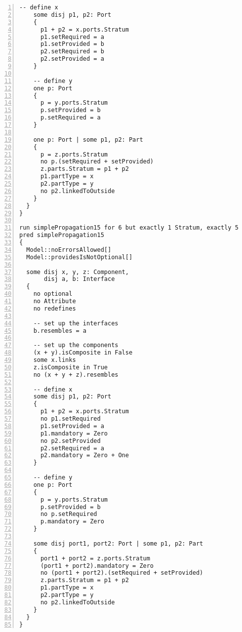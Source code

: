\begin{lstlisting}[caption={unittests\_inference.als}, numbers=left]
    -- define x
    some disj p1, p2: Port
    {
      p1 + p2 = x.ports.Stratum
      p1.setRequired = a
      p1.setProvided = b
      p2.setRequired = b
      p2.setProvided = a
    }
    
    -- define y
    one p: Port
    {
      p = y.ports.Stratum
      p.setProvided = b
      p.setRequired = a
    }
    
    one p: Port | some p1, p2: Part
    {
      p = z.ports.Stratum
      no p.(setRequired + setProvided)
      z.parts.Stratum = p1 + p2
      p1.partType = x
      p2.partType = y
      no p2.linkedToOutside
    }
  }
}

run simplePropagation15 for 6 but exactly 1 Stratum, exactly 5 Element, exactly 5 Port, exactly 2 Part, exactly 3 Component, exactly 2 Interface, exactly 3 Connector, 8 LinkEnd
pred simplePropagation15
{
  Model::noErrorsAllowed[]
  Model::providesIsNotOptional[]

  some disj x, y, z: Component,
       disj a, b: Interface
  {
    no optional
    no Attribute
    no redefines
  
    -- set up the interfaces
    b.resembles = a
  
    -- set up the components
    (x + y).isComposite in False
    some x.links
    z.isComposite in True
    no (x + y + z).resembles
    
    -- define x
    some disj p1, p2: Port
    {
      p1 + p2 = x.ports.Stratum
      no p1.setRequired
      p1.setProvided = a
      p1.mandatory = Zero
      no p2.setProvided
      p2.setRequired = a
      p2.mandatory = Zero + One
    }
    
    -- define y
    one p: Port
    {
      p = y.ports.Stratum
      p.setProvided = b
      no p.setRequired
      p.mandatory = Zero
    }
    
    some disj port1, port2: Port | some p1, p2: Part
    {
      port1 + port2 = z.ports.Stratum
      (port1 + port2).mandatory = Zero
      no (port1 + port2).(setRequired + setProvided)
      z.parts.Stratum = p1 + p2
      p1.partType = x
      p2.partType = y
      no p2.linkedToOutside
    }
  }
}

\end{lstlisting}